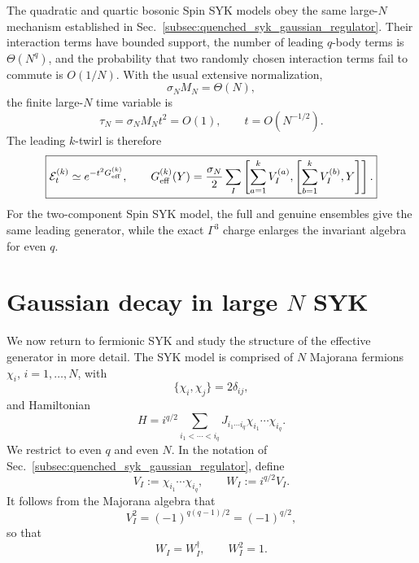 \documentclass{article}
\theoremstyle{definition}
\begin{document}
The quadratic and quartic bosonic Spin SYK models obey the same large-$N$
mechanism established in Sec.~\ref{subsec:quenched_syk_gaussian_regulator}.
Their interaction terms have bounded support, the number of leading
$q$-body terms is $\Theta(N^q)$, and the probability that two randomly
chosen interaction terms fail to commute is $O(1/N)$.  With the usual
extensive normalization,
\begin{equation}
    \sigma_NM_N=\Theta(N),
\end{equation}
the finite large-$N$ time variable is
\begin{equation}
    \tau_N
    =
    \sigma_NM_Nt^2
    =
    O(1),
    \qquad
    t=O(N^{-1/2}).
\end{equation}
The leading $k$-twirl is therefore
\begin{equation}
    \boxed{
    {\cal E}_t^{(k)}
    \simeq
    e^{-t^2G_{\rm eff}^{(k)}},
    \qquad
    G_{\rm eff}^{(k)}(Y)
    =
    \frac{\sigma_N}{2}
    \sum_I
    \left[
       \sum_{a=1}^kV_I^{(a)},
       \left[
          \sum_{b=1}^kV_I^{(b)},Y
       \right]
    \right].
    }
    \label{eq:bosonic_spin_syk_final_box}
\end{equation}
For the two-component Spin SYK model, the full and genuine ensembles give
the same leading generator, while the exact $\Gamma^3$ charge enlarges
the invariant algebra for even $q$.



\section{Gaussian decay in large $N$ SYK}
\label{sec:largeN_SYK}

We now return to fermionic SYK and study the structure of the effective
generator in more detail.  The SYK model is comprised of $N$ Majorana
fermions $\chi_i$, $i=1,\ldots,N$, with
\begin{equation}
    \{\chi_i,\chi_j\}=2\delta_{ij},
\end{equation}
and Hamiltonian
\begin{equation}
    H
    =
    i^{q/2}
    \sum_{i_1<\cdots<i_q}
    J_{i_1\cdots i_q}
    \chi_{i_1}\cdots\chi_{i_q}.
    \label{eq:SYK_H_static}
\end{equation}
We restrict to even $q$ and even $N$.  In the notation of
Sec.~\ref{subsec:quenched_syk_gaussian_regulator}, define
\begin{equation}
    V_I
    :=
    \chi_{i_1}\cdots\chi_{i_q},
    \qquad
    W_I
    :=
    i^{q/2}V_I.
    \label{eq:SYK_VW}
\end{equation}
It follows from the Majorana algebra that
\begin{equation}
    V_I^2
    =
    (-1)^{q(q-1)/2}
    =
    (-1)^{q/2},
\end{equation}
so that
\begin{equation}
    W_I=W_I^\dagger,
    \qquad
    W_I^2=1.
    \label{eq:SYK_W_square}
\end{equation}
\end{document}
